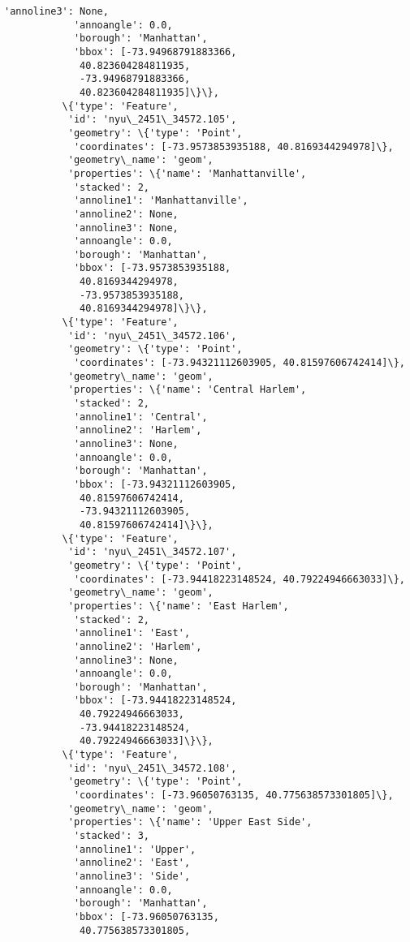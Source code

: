 \documentclass[11pt]{article}
\begin{document}
\begin{Verbatim}[commandchars=\\\{\}]
            'annoline3': None,
            'annoangle': 0.0,
            'borough': 'Manhattan',
            'bbox': [-73.94968791883366,
             40.823604284811935,
             -73.94968791883366,
             40.823604284811935]\}\},
          \{'type': 'Feature',
           'id': 'nyu\_2451\_34572.105',
           'geometry': \{'type': 'Point',
            'coordinates': [-73.9573853935188, 40.8169344294978]\},
           'geometry\_name': 'geom',
           'properties': \{'name': 'Manhattanville',
            'stacked': 2,
            'annoline1': 'Manhattanville',
            'annoline2': None,
            'annoline3': None,
            'annoangle': 0.0,
            'borough': 'Manhattan',
            'bbox': [-73.9573853935188,
             40.8169344294978,
             -73.9573853935188,
             40.8169344294978]\}\},
          \{'type': 'Feature',
           'id': 'nyu\_2451\_34572.106',
           'geometry': \{'type': 'Point',
            'coordinates': [-73.94321112603905, 40.81597606742414]\},
           'geometry\_name': 'geom',
           'properties': \{'name': 'Central Harlem',
            'stacked': 2,
            'annoline1': 'Central',
            'annoline2': 'Harlem',
            'annoline3': None,
            'annoangle': 0.0,
            'borough': 'Manhattan',
            'bbox': [-73.94321112603905,
             40.81597606742414,
             -73.94321112603905,
             40.81597606742414]\}\},
          \{'type': 'Feature',
           'id': 'nyu\_2451\_34572.107',
           'geometry': \{'type': 'Point',
            'coordinates': [-73.94418223148524, 40.79224946663033]\},
           'geometry\_name': 'geom',
           'properties': \{'name': 'East Harlem',
            'stacked': 2,
            'annoline1': 'East',
            'annoline2': 'Harlem',
            'annoline3': None,
            'annoangle': 0.0,
            'borough': 'Manhattan',
            'bbox': [-73.94418223148524,
             40.79224946663033,
             -73.94418223148524,
             40.79224946663033]\}\},
          \{'type': 'Feature',
           'id': 'nyu\_2451\_34572.108',
           'geometry': \{'type': 'Point',
            'coordinates': [-73.96050763135, 40.775638573301805]\},
           'geometry\_name': 'geom',
           'properties': \{'name': 'Upper East Side',
            'stacked': 3,
            'annoline1': 'Upper',
            'annoline2': 'East',
            'annoline3': 'Side',
            'annoangle': 0.0,
            'borough': 'Manhattan',
            'bbox': [-73.96050763135,
             40.775638573301805,

\end{Verbatim}
\end{document}
